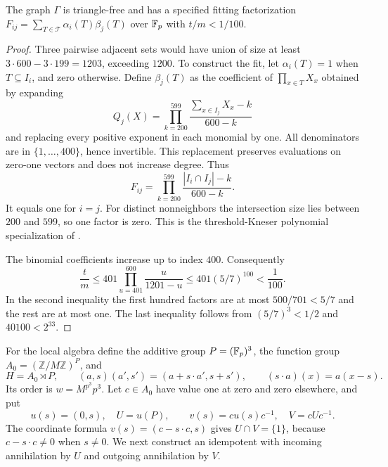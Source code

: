 \begin{proposition}\label{op:graph}
The graph $\Gamma$ is triangle-free and has a specified fitting
factorization $F_{ij}=\sum_{T\in\mathcal T}\alpha_i(T)\beta_j(T)$
over $\mathbb F_p$ with $t/m<1/100$.
\end{proposition}
\begin{proof}
Three pairwise adjacent sets would have union of size at least
$3\cdot600-3\cdot199=1203$, exceeding $1200$. To construct the fit, let
$\alpha_i(T)=1$ when $T\subseteq I_i$, and zero otherwise. Define
$\beta_j(T)$ as the coefficient of $\prod_{x\in T}X_x$ obtained by
expanding
\[
 Q_j(X)=\prod_{k=200}^{599}
       \frac{\sum_{x\in I_j}X_x-k}{600-k}
\]
and replacing every positive exponent in each monomial by one. All
denominators are in $\{1,\ldots,400\}$, hence invertible. This replacement
preserves evaluations on zero-one vectors and does not increase degree.
Thus
\[
 F_{ij}=\prod_{k=200}^{599}\frac{|I_i\cap I_j|-k}{600-k}.
\]
It equals one for $i=j$. For distinct nonneighbors the intersection
size lies between $200$ and $599$, so one factor is zero. This is the
threshold-Kneser polynomial specialization of
\cite[Proposition~13]{Haviv2018Theta}
\cite[Theorem~3.2]{GolovnevHaviv2022}.

The binomial coefficients increase up to index $400$. Consequently
\[
 \frac{t}{m}
 \le401\prod_{u=401}^{600}\frac{u}{1201-u}
 \le401(5/7)^{100}<\frac1{100}.
\]
In the second inequality the first hundred factors are at most
$500/701<5/7$ and the rest are at most one. The last inequality follows
from $(5/7)^3<1/2$ and $40100<2^{33}$.
\end{proof}

For the local algebra define the additive group $P=(\mathbb F_p)^3$, the
function group $A_0=(\mathbb Z/M\mathbb Z)^P$, and
\[
 H=A_0\rtimes P,\qquad
 (a,s)(a',s')=(a+s\cdot a',s+s'),\qquad
 (s\cdot a)(x)=a(x-s).
\]
Its order is $w=M^{p^3}p^3$. Let $c\in A_0$ have value one at zero and
zero elsewhere, and put
\[
 u(s)=(0,s),\quad U=u(P),\qquad
 v(s)=cu(s)c^{-1},\quad V=cUc^{-1}.
\]
The coordinate formula $v(s)=(c-s\cdot c,s)$ gives $U\cap V=\{1\}$,
because $c-s\cdot c\ne0$ when $s\ne0$. We next construct an idempotent
with incoming annihilation by $U$ and outgoing annihilation by $V$.
